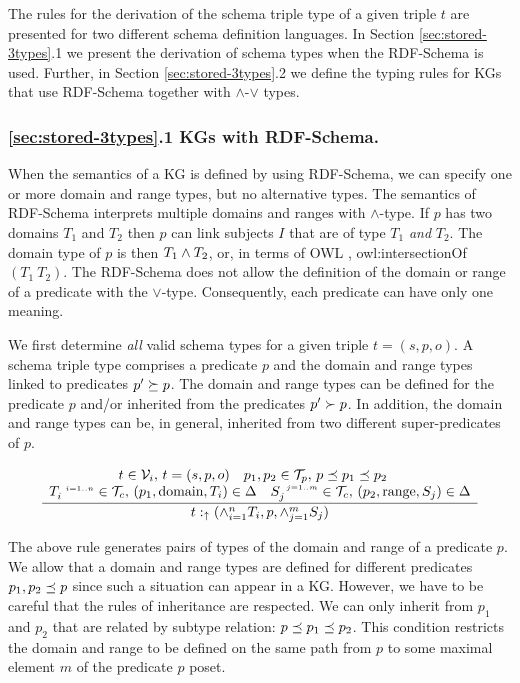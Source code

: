 \documentclass[runningheads]{llncs}
\newcommand{\s}{\scriptscriptstyle\ \,}
\newcommand{\uarr}{\uparrow}
\newcommand{\V}{{\cal V}}
\newcommand{\T}{{\cal T}}
\begin{document}
The rules for the derivation of the schema triple type of a given
triple $t$ are presented for two different schema definition
languages. In Section \ref{sec:stored-3types}.1 we present the
derivation of schema types when the RDF-Schema is used. Further, in
Section \ref{sec:stored-3types}.2 we define the typing rules for
KGs that use RDF-Schema together with $\land$-$\lor$ types.






\subsubsection{\ref{sec:stored-3types}.1 KGs with RDF-Schema.}
When the semantics of a KG is defined by using RDF-Schema, we can
specify one or more domain and range types, but no alternative
types. The semantics of RDF-Schema \cite{rdfsemantics} interprets
multiple domains and ranges with $\land$-type. If $p$ has two domains
$T_1$ and $T_2$ then $p$ can link subjects $I$ that are of type $T_1$
\emph{and} $T_2$. The domain type of $p$ is then $T_1\land\/T_2$, or,
in terms of OWL \cite{owl}, owl:intersectionOf$(T_1\ T_2)$. The
RDF-Schema does not allow the definition of the domain or range of a
predicate with the $\lor$-type. Consequently, each predicate can have
only one meaning.

We first determine \emph{all} valid schema types for a given triple
$t=(s,p,o)$. A schema triple type comprises a predicate $p$ and the
domain and range types linked to predicates $p'\succeq\/p$. The domain
and range types can be defined for the predicate $p$ and/or inherited
from the predicates $p'\succ\/p$. In addition, the domain and range
types can be, in general, inherited from two different
super-predicates of $p$.

\begin{equation}
\label{rul:3-stored1}
\dfrac{\begin{array}{c}
       t\in\V_i,\, t=(s,p,o)\quad p_1,p_2\in\T_p,\, p\preceq\/p_1\preceq\/p_2\quad \\
       T_i^{\s\/i=1..n}\in\T_c,\, (p_1,\text{domain},T_i)\in\/\Delta\quad S_j^{\s\/j=1..m}\in\T_c,\, (p_2,\text{range},S_j)\in\Delta
       \end{array}}
      {t:_\uarr\/(\land_{i=1}^n\/T_i, p, \land_{j=1}^m\/S_j)}
\end{equation}

The above rule generates pairs of types of the domain and range of a
predicate $p$. We allow that a domain and range types are defined for
different predicates $p_1,p_2\preceq\/p$ since such a situation can
appear in a KG. However, we have to be careful that the rules of
inheritance are respected. We can only inherit from $p_1$ and $p_2$
that are related by subtype relation:
$p\preceq\/p_1\preceq\/p_2$. This condition restricts the domain and
range to be defined on the same path from $p$ to some maximal element
$m$ of the predicate $p$ poset. 
\end{document}
